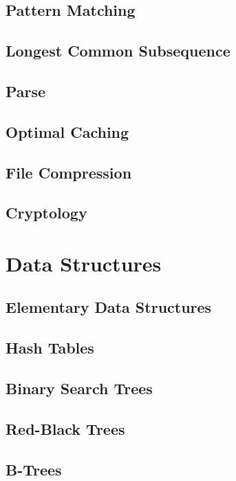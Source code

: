 			\section{Pattern Matching}

			\section{Longest Common Subsequence}

			\section{Parse}

			\section{Optimal Caching}

			\section{File Compression}

			\section{Cryptology}

		\chapter{Data Structures}
			\section{Elementary Data Structures}

			\section{Hash Tables}

			\section{Binary Search Trees}

			\section{Red-Black Trees}

			\section{B-Trees}

